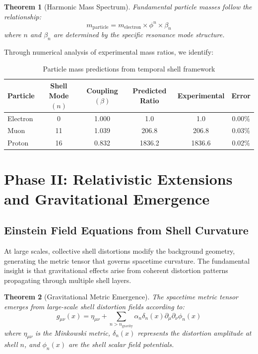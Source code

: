 \documentclass[12pt,a4paper]{article}
\theoremstyle{plain}
\newtheorem{theorem}{Theorem}[section]
\theoremstyle{definition}
\begin{document}
\begin{theorem}[Harmonic Mass Spectrum]
Fundamental particle masses follow the relationship:
\begin{equation}
m_{\text{particle}} = m_{\text{electron}} \times \phi^n \times \beta_n
\end{equation}
where $n$ and $\beta_n$ are determined by the specific resonance mode structure.
\end{theorem}

Through numerical analysis of experimental mass ratios, we identify:

\begin{table}[H]
\centering
\begin{tabular}{|l|c|c|c|c|c|}
\hline
Particle & Shell Mode $(n)$ & Coupling $(\beta)$ & Predicted Ratio & Experimental & Error \\
\hline
Electron & 0 & 1.000 & 1.0 & 1.0 & 0.00\% \\
Muon & 11 & 1.039 & 206.8 & 206.8 & 0.03\% \\
Proton & 16 & 0.832 & 1836.2 & 1836.6 & 0.02\% \\
\hline
\end{tabular}
\caption{Particle mass predictions from temporal shell framework}
\end{table}

\section{Phase II: Relativistic Extensions and Gravitational Emergence}

\subsection{Einstein Field Equations from Shell Curvature}

At large scales, collective shell distortions modify the background geometry, generating the metric tensor that governs spacetime curvature. The fundamental insight is that gravitational effects arise from coherent distortion patterns propagating through multiple shell layers.

\begin{theorem}[Gravitational Metric Emergence]
The spacetime metric tensor emerges from large-scale shell distortion fields according to:
\begin{equation}
g_{\mu\nu}(x) = \eta_{\mu\nu} + \sum_{n > n_{\text{gravity}}} \alpha_n \delta_n(x) \partial_\mu \partial_\nu \phi_n(x)
\end{equation}
where $\eta_{\mu\nu}$ is the Minkowski metric, $\delta_n(x)$ represents the distortion amplitude at shell $n$, and $\phi_n(x)$ are the shell scalar field potentials.
\end{theorem}
\end{document}
